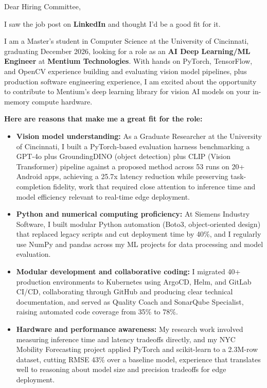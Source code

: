 \documentclass[11pt]{letter}
\date{}
\begin{document}
\begin{letter}{}

\opening{Dear Hiring Committee,}

I saw the job post on \textbf{LinkedIn} and thought I'd be a good fit for it.

I am a Master's student in Computer Science at the University of Cincinnati, graduating December 2026, looking for a role as an \textbf{AI Deep Learning/ML Engineer} at \textbf{Mentium Technologies}. With hands on PyTorch, TensorFlow, and OpenCV experience building and evaluating vision model pipelines, plus production software engineering experience, I am excited about the opportunity to contribute to Mentium's deep learning library for vision AI models on your in-memory compute hardware.

\textbf{Here are reasons that make me a great fit for the role:}

\begin{itemize}[leftmargin=*, itemsep=0.45em]
    \item \textbf{Vision model understanding:} As a Graduate Researcher at the University of Cincinnati, I built a PyTorch-based evaluation harness benchmarking a GPT-4o plus GroundingDINO (object detection) plus CLIP (Vision Transformer) pipeline against a proposed method across 53 runs on 20+ Android apps, achieving a 25.7x latency reduction while preserving task-completion fidelity, work that required close attention to inference time and model efficiency relevant to real-time edge deployment.

    \item \textbf{Python and numerical computing proficiency:} At Siemens Industry Software, I built modular Python automation (Boto3, object-oriented design) that replaced legacy scripts and cut deployment time by 40\%, and I regularly use NumPy and pandas across my ML projects for data processing and model evaluation.

    \item \textbf{Modular development and collaborative coding:} I migrated 40+ production environments to Kubernetes using ArgoCD, Helm, and GitLab CI/CD, collaborating through GitHub and producing clear technical documentation, and served as Quality Coach and SonarQube Specialist, raising automated code coverage from 35\% to 78\%.

    \item \textbf{Hardware and performance awareness:} My research work involved measuring inference time and latency tradeoffs directly, and my NYC Mobility Forecasting project applied PyTorch and scikit-learn to a 2.3M-row dataset, cutting RMSE 43\% over a baseline model, experience that translates well to reasoning about model size and precision tradeoffs for edge deployment.
\end{itemize}


\end{letter}
\end{document}
